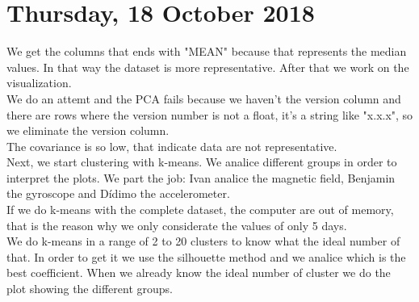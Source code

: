 \section{Thursday, 18 October 2018}

We get the columns that ends with "MEAN" because that represents the median values. In that way the dataset is more representative. After that we work on the visualization.\\
We do an attemt and the PCA fails because we haven't the version column and there are rows where the version number is not a float, it's a string like "x.x.x", so we eliminate the version column.\\
The covariance is so low, that indicate data are not representative.\\
Next, we start clustering with k-means. We analice different groups in order to interpret the plots. We part the job: Ivan analice the magnetic field, Benjamin the gyroscope and Dídimo the accelerometer.\\
If we do k-means with the complete dataset, the computer are out of memory, that is the reason why we only considerate the values of only 5 days.\\
We do k-means in a range of 2 to 20 clusters to know what the ideal number of that. In order to get it we use the silhouette method and we analice which is the best coefficient. When we already know the ideal number of cluster we do the plot showing the different groups. 
